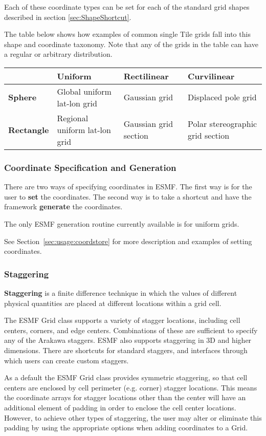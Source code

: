Each of these coordinate types can be set for each of the standard grid shapes
described in section \ref{sec:ShapeShortcut}.  

The table below shows how examples of common single Tile grids fall 
into this shape and coordinate taxonomy.  Note that any
of the grids in the table can have a regular or arbitrary distribution.

\medskip
\begin{tabular}{|p{.9in}|p{1.7in}|p{1.7in}|p{1.7in}|}
\hline
 & {\bf Uniform} & {\bf Rectilinear} & {\bf Curvilinear} \\ 
\hline
{\bf Sphere} & Global uniform lat-lon grid & Gaussian grid & Displaced pole grid \\
\hline
{\bf Rectangle} & Regional uniform lat-lon grid & Gaussian grid section & Polar stereographic grid section\\
\hline
\end{tabular}

\subsubsection{Coordinate Specification and Generation}

There are two ways of specifying coordinates in ESMF.  The
first way is for the user to {\bf set} the coordinates.  The second 
way is to take a shortcut and have the framework {\bf generate}
the coordinates.  

The only ESMF generation routine currently available is for uniform grids.

See Section~\ref{sec:usage:coordstore} for more description and examples of
setting coordinates.

\subsubsection{Staggering}

{\bf Staggering} is a finite difference technique in which the values 
of different physical quantities are placed at different locations
within a grid cell. 

The ESMF Grid class supports a variety of stagger locations, including
cell centers, corners, and edge centers.  Combinations of these are
sufficient to specify any of the Arakawa staggers.  ESMF also supports
staggering in 3D and higher dimensions.  There are shortcuts for 
standard staggers, and interfaces through which users can create custom
staggers.

As a default the ESMF Grid class provides symmetric staggering, so
that cell centers are enclosed by cell perimeter (e.g. corner) 
stagger locations. This means the coordinate arrays for stagger
locations other than the center will have an additional element of 
padding in order to enclose the cell center locations.
However, to achieve other types of staggering, the user may alter 
or eliminate this padding by using the appropriate options when adding
coordinates to a Grid. 
 
